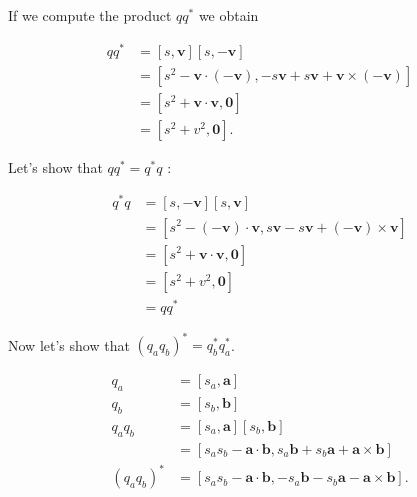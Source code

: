 If we compute the product $q q^{*}$ we obtain

$$
    \begin{aligned}
        q q^{*} & =[s, \mathbf{v}][s,-\mathbf{v}]                                                                             \\
                & =\left[s^{2}-\mathbf{v} \cdot(-\mathbf{v}),-s \mathbf{v}+s \mathbf{v}+\mathbf{v} \times(-\mathbf{v})\right] \\
                & =\left[s^{2}+\mathbf{v} \cdot \mathbf{v}, \mathbf{0}\right]                                                 \\
                & =\left[s^{2}+v^{2}, \mathbf{0}\right] .
    \end{aligned}
$$

Let's show that $q q^{*}=q^{*} q$ :

$$
    \begin{aligned}
        q^{*} q & =[s,-\mathbf{v}][s, \mathbf{v}]                                                                               \\
                & =\left[s^{2}-(-\mathbf{v}) \cdot \mathbf{v}, s \mathbf{v}-s \mathbf{v}+(-\mathbf{v}) \times \mathbf{v}\right] \\
                & =\left[s^{2}+\mathbf{v} \cdot \mathbf{v}, \mathbf{0}\right]                                                   \\
                & =\left[s^{2}+v^{2}, \mathbf{0}\right]                                                                         \\
                & =q q^{*}
    \end{aligned}
$$

Now let's show that $\left(q_{a} q_{b}\right)^{*}=q_{b}^{*} q_{a}^{*}$.

$$
    \begin{aligned}
        q_{a}                        & =\left[s_{a}, \mathbf{a}\right]                                                                                         \\
        q_{b}                        & =\left[s_{b}, \mathbf{b}\right]                                                                                         \\
        q_{a} q_{b}                  & =\left[s_{a}, \mathbf{a}\right]\left[s_{b}, \mathbf{b}\right]                                                           \\
                                     & =\left[s_{a} s_{b}-\mathbf{a} \cdot \mathbf{b}, s_{a} \mathbf{b}+s_{b} \mathbf{a}+\mathbf{a} \times \mathbf{b}\right]   \\
        \left(q_{a} q_{b}\right)^{*} & =\left[s_{a} s_{b}-\mathbf{a} \cdot \mathbf{b},-s_{a} \mathbf{b}-s_{b} \mathbf{a}-\mathbf{a} \times \mathbf{b}\right] .
    \end{aligned}
$$

